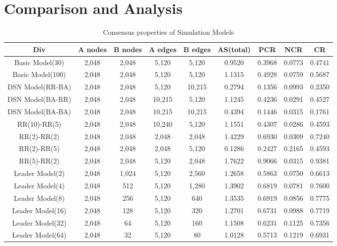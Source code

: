 \documentclass[english]{cccconf}
\begin{document}
\section{Comparison and Analysis}
\begin{table}[!htb]
	\centering
	\caption{Consensus properties of Simulation Models}
	\label{tab1}
	\begin{center}
		\begin{tabular}{c|c|c|c|c|c|c|c|c} \hline\hline
			Div               & A nodes & B nodes & A edges & B edges & AS(total) & PCR    & NCR    & CR       \\ \hline \hline
			Basic Model(30)   & 2,048   & 2,048   & 5,120   & 5,120   & 0.9520    & 0.3968 & 0.0773 & 0.4741   \\ \hline
			Basic Model(100)  & 2,048   & 2,048   & 5,120   & 5,120   & 1.1315    & 0.4928 & 0.0759 & 0.5687   \\ \hline
			DSN Model(RR-BA)  & 2,048 	& 2,048   & 5,120   & 10,215  & 0.2794    & 0.1356 & 0.0993 & 0.2350   \\ \hline 
			DSN Model(BA-RR)  & 2,048 	& 2,048   & 10,215  & 5,120   & 1.1245    & 0.4236 & 0.0291 & 0.4527   \\ \hline
			DSN Model(BA-BA)  & 2,048 	& 2,048   & 10,215  & 10,215  & 0.4394    & 0.1446 & 0.0315 & 0.1761   \\ \hline
			RR(10)-RR(5)      & 2,048 	& 2,048   & 10,240  & 5,120   & 1.1551    & 0.4307 & 0.0286 & 0.4593   \\ \hline
			RR(2)-RR(2)       & 2,048 	& 2,048   & 2,048   & 2,048   & 1.4229    & 0.6930 & 0.0309 & 0.7240   \\ \hline 
			RR(2)-RR(5)       & 2,048 	& 2,048   & 2,048   & 5,120   & 0.1286    & 0.2427 & 0.2165 & 0.4593   \\ \hline 
			RR(5)-RR(2)       & 2,048 	& 2,048   & 5,120   & 2,048   & 1.7622    & 0.9066 & 0.0315 & 0.9381   \\ \hline
			Leader Model(2)   & 2,048 	& 1,024   & 5,120   & 2,560   & 1.2658    & 0.5863 & 0.0750 & 0.6613   \\ \hline    
			Leader Model(4)   & 2,048 	&  512    & 5,120   & 1,280   & 1.3902    & 0.6819 & 0.0781 & 0.7600   \\ \hline
			Leader Model(8)   & 2,048 	&  256    & 5,120   & 640     & 1.3535    & 0.6919 & 0.0856 & 0.7775   \\ \hline
			Leader Model(16)  & 2,048 	&  128    & 5,120   & 320     & 1.2701    & 0.6731 & 0.0988 & 0.7719   \\ \hline
			Leader Model(32)  & 2,048 	&   64    & 5,120   & 160     & 1.1508    & 0.6231 & 0.1125 & 0.7356   \\ \hline
			Leader Model(64)  & 2,048 	&   32    & 5,120   & 80      & 1.0128    & 0.5713 & 0.1219 & 0.6931   \\ \hline  \hline
		\end{tabular}
	\end{center}
\end{table}
\end{document}
